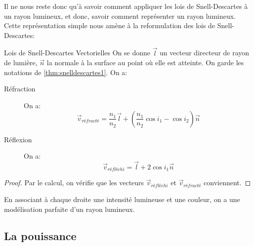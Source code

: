 \documentclass{classe}
\begin{document}
Il ne nous reste donc qu'à savoir comment appliquer les lois de Snell-Descartes à un rayon lumineux, et donc, savoir comment représenter un rayon lumineux.
Cette représentation simple nous amène à la reformulation des lois de Snell-Descartes:
\begin{propositionfr}{Lois de Snell-Descartes Vectorielles}{}
	On se donne $\overrightarrow{l}$ un vecteur directeur de rayon de lumière, $\vec{n}$ la normale à la surface au point où elle est atteinte.
	On garde les notations de \ref{thm:snelldescartes1}.
	On a:
	\begin{description}
		\item[Réfraction] On a:
			\begin{equation}
				\vec{v}_{réfracté} = \frac{n_{1}}{n_{2}}\vec{l} + \left(\frac{n_{1}}{n_{2}}\cos i_{1} - \cos i_{2}\right) \vec{n}
				\label{snelldescartesrefraction}
			\end{equation}
		\item[Réflexion] On a:
			\begin{equation}
				\vec{v}_{réfléchi} = \vec{l} + 2\cos i_{1}\vec{n}
				\label{snelldescartesreflexion}
			\end{equation}
	\end{description}
\end{propositionfr}
\begin{proof}
	Par le calcul, on vérifie que les vecteurs $\vec{v}_{réfléchi}$ et $\vec{v}_{réfracté}$ conviennent.
\end{proof}
En associant à chaque droite une intensité lumineuse et une couleur, on a une modélisation parfaite d'un rayon lumineux.

\subsection{La pouissance}
\end{document}
